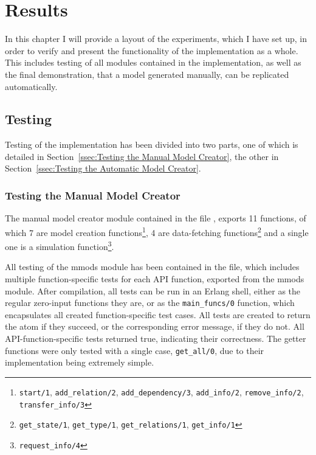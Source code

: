 \chapter{Results}

In this chapter I will provide a layout of the experiments, which I have set up, in order to verify and present the functionality of the implementation as a whole. This includes testing of all modules contained in the implementation, as well as the final demonstration, that a model generated manually, can be replicated automatically.

\section{Testing}

Testing of the implementation has been divided into two parts, one of which is detailed in Section~\ref{ssec:Testing the Manual Model Creator}, the other in Section~\ref{ssec:Testing the Automatic Model Creator}.

\subsection{Testing the Manual Model Creator}
The manual model creator module contained in the file , exports 11 functions, of which 7 are model creation functions\footnote{\lstinline{start/1}, \lstinline{add_relation/2}, \lstinline{add_dependency/3}, \lstinline{add_info/2}, \lstinline{remove_info/2}, \lstinline{transfer_info/3}}, 4 are data-fetching functions\footnote{\lstinline{get_state/1}, \lstinline{get_type/1}, \lstinline{get_relations/1}, \lstinline{get_info/1}} and a single one is a simulation function\footnote{\lstinline{request_info/4}}.

All testing of the mmods module has been contained in the  file, which includes multiple function-specific tests for each API function, exported from the mmods module. After compilation, all tests can be run in an Erlang shell, either as the regular zero-input functions they are, or as the \linebreak \lstinline{main_funcs/0} function, which encapsulates all created function-specific test cases. All tests are created to return the atom  if they succeed, or the corresponding error message, if they do not. All API-function-specific tests returned true, indicating their correctness. The getter functions were only tested with a single case, \lstinline{get_all/0}, due to their implementation being extremely simple.


